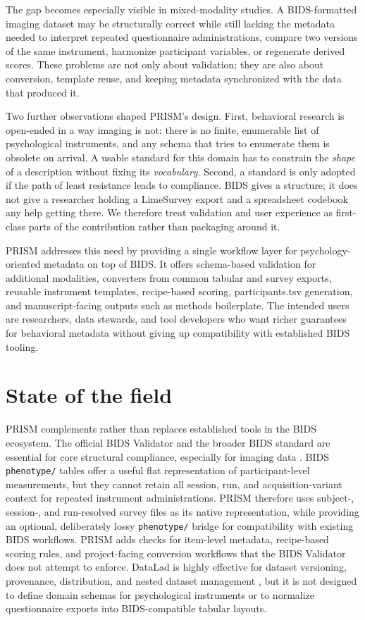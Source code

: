 \documentclass[10pt]{article}
\begin{document}
The gap becomes especially visible in mixed-modality studies. A
BIDS-formatted imaging dataset may be structurally correct while still
lacking the metadata needed to interpret repeated questionnaire
administrations, compare two versions of the same instrument, harmonize
participant variables, or regenerate derived scores. These problems are not
only about validation; they are also about conversion, template reuse, and
keeping metadata synchronized with the data that produced it.

Two further observations shaped PRISM's design. First, behavioral research
is open-ended in a way imaging is not: there is no finite, enumerable list
of psychological instruments, and any schema that tries to enumerate them
is obsolete on arrival. A usable standard for this domain has to constrain
the \emph{shape} of a description without fixing its \emph{vocabulary}.
Second, a standard is only adopted if the path of least resistance leads to
compliance. BIDS gives a structure; it does not give a researcher holding a
LimeSurvey export and a spreadsheet codebook any help getting there. We
therefore treat validation and user experience as first-class parts of the
contribution rather than packaging around it.

PRISM addresses this need by providing a single workflow layer for
psychology-oriented metadata on top of BIDS. It offers schema-based
validation for additional modalities, converters from common tabular and
survey exports, reusable instrument templates, recipe-based scoring,
participants.tsv generation, and manuscript-facing outputs such as methods
boilerplate. The intended users are researchers, data stewards, and tool
developers who want richer guarantees for behavioral metadata without
giving up compatibility with established BIDS tooling.

\section{State of the field}

PRISM complements rather than replaces established tools in the BIDS
ecosystem. The official BIDS Validator and the broader BIDS standard are
essential for core structural compliance, especially for imaging data
\citep{gorgolewski2016bids}. BIDS \texttt{phenotype/} tables offer a useful
flat representation of participant-level measurements, but they cannot
retain all session, run, and acquisition-variant context for repeated
instrument administrations. PRISM therefore uses subject-, session-, and
run-resolved survey files as its native representation, while providing an
optional, deliberately lossy \texttt{phenotype/} bridge for compatibility
with existing BIDS workflows. PRISM adds checks for item-level metadata,
recipe-based scoring rules, and project-facing conversion workflows that the
BIDS Validator does not attempt to enforce. DataLad is highly effective for
dataset versioning, provenance, distribution, and nested dataset management
\citep{halchenko2021datalad}, but it is not designed to define domain
schemas for psychological instruments or to normalize questionnaire exports
into BIDS-compatible tabular layouts.
\end{document}
